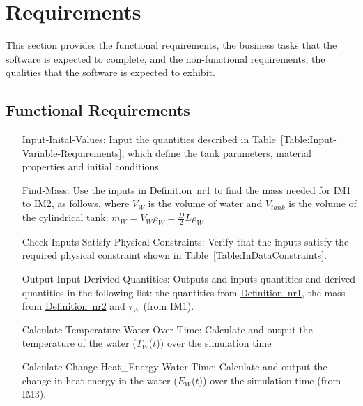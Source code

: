 \documentclass[12pt]{article}
\begin{document}
\section{Requirements}
\label{Sec:Requirements}
This section provides the functional requirements, the business tasks that the software is expected to complete, and the non-functional requirements, the qualities that the software is expected to exhibit.
\subsection{Functional Requirements}
\label{Sec:FRs}
\begin{itemize}
\item[Input-Inital-Values:]\label{nr1}
                           Input the quantities described in Table~\ref{Table:Input-Variable-Requirements}, which define the tank parameters, material properties and initial conditions.
\item[Find-Mass:]\label{nr2}
                 Use the inputs in \hyperref[nr1]{Definition~nr1} to find the mass needed for IM1 to IM2, as follows, where ${V_{W}}$ is the volume of water and ${V_{tank}}$ is the volume of the cylindrical tank: ${m_{W}}={V_{W}} {ρ_{W}}=\frac{D}{2} L {ρ_{W}}$
\item[Check-Inputs-Satisfy-Physical-Constraints:]\label{nr3}
                                                 Verify that the inputs satisfy the required physical constraint shown in Table~\ref{Table:InDataConstraints}.
\item[Output-Input-Derivied-Quantities:]\label{nr4}
                                        Outputs and inputs quantities and derived quantities in the following list: the quantities from \hyperref[nr1]{Definition~nr1}, the mass from \hyperref[nr2]{Definition~nr2} and ${τ_{W}}$ (from IM1).
\item[Calculate-Temperature-Water-Over-Time:]\label{nr5}
                                             Calculate and output the temperature of the water (${T_{W}}$($t$)) over the simulation time
\item[Calculate-Change-Heat\_Energy-Water-Time:]\label{nr6}
                                                Calculate and output the change in heat energy in the water (${E_{W}}$($t$)) over the simulation time (from IM3).
\end{itemize}
\end{document}
